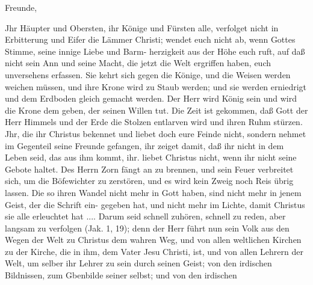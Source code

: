 {
Freunde,

\bigskip

Jhr Häupter und Obersten, ihr Könige und Fürsten alle,
verfolget nicht in Erbitterung und Eifer die Lämmer Christi; wendet
euch nicht ab, wenn Gottes Stimme, seine innige Liebe und Barm-
herzigkeit aus der Höhe euch ruft, auf daß nicht sein Ann und
seine Macht, die jetzt die Welt ergriffen haben, euch unversehens
erfassen. Sie kehrt sich gegen die Könige, und die Weisen werden
weichen müssen, und ihre Krone wird zu Staub werden; und sie
werden erniedrigt und dem Erdboden gleich gemacht werden. Der
Herr wird König sein und wird die Krone dem geben, der seinen
Willen tut. Die Zeit ist gekommen, daß Gott der Herr Himmels
und der Erde die Stolzen entlarven wird und ihren Ruhm stürzen.
Jhr, die ihr Christus bekennet und liebet doch eure Feinde nicht,
sondern nehmet im Gegenteil seine Freunde gefangen, ihr zeiget
damit, daß ihr nicht in dem Leben seid, das aus ihm kommt, ihr.
liebet Christus nicht, wenn ihr nicht seine Gebote haltet. Des
Herrn Zorn fängt an zu brennen, und sein Feuer verbreitet
sich, um die Böfewichter zu zerstören, und es wird kein Zweig
noch Reis übrig lassen. Die so ihren Wandel nicht mehr in
Gott haben, sind nicht mehr in jenem Geist, der die Schrift ein-
gegeben hat, und nicht mehr im Lichte, damit Christus sie alle
erleuchtet hat .... Darum seid schnell zuhören, schnell zu reden,
aber langsam zu verfolgen (Jak. 1, 19); denn der Herr führt nun
sein Volk aus den Wegen der Welt zu Christus dem wahren
Weg, und von allen weltlichen Kirchen zu der Kirche, die in ihm,
dem Vater Jesu Christi, ist, und von allen Lehrern der Welt,
um selber ihr Lehrer zu sein durch seinen Geist; von den irdischen
Bildnissen, zum Gbenbilde seiner selbst; und von den irdischen


}
